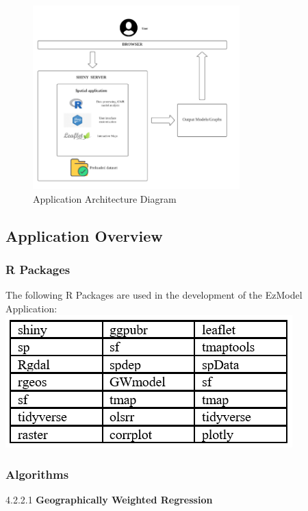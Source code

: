 \documentclass{acm_proc_article-sp}
\begin{document}
\begin{figure}[h]
\centering
\includegraphics[width=8cm]{App Archite.png}
\caption{Application Architecture Diagram}\label{fig1}
\end{figure}

\hypertarget{application-overview}{%
\subsection{Application Overview}\label{application-overview}}

\hypertarget{r-packages}{%
\subsubsection{R Packages}\label{r-packages}}

The following R Packages are used in the development of the EzModel
Application:\\

\includegraphics{Table.png}\\

\hypertarget{algorithms}{%
\subsubsection{Algorithms}\label{algorithms}}

4.2.2.1 \textbf{Geographically Weighted Regression}
\end{document}
